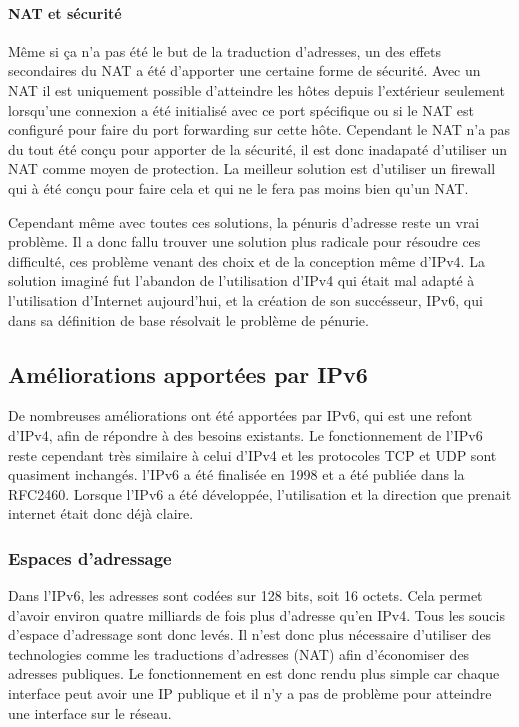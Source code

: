 \paragraph{NAT et sécurité}

Même si ça n'a pas été le but de la traduction d'adresses, un des effets
secondaires du NAT a été d'apporter une certaine forme de sécurité.  Avec un
NAT il est uniquement possible d'atteindre les hôtes depuis l'extérieur
seulement lorsqu'une connexion a été initialisé avec ce port spécifique ou si
le NAT est configuré pour faire du port forwarding sur cette hôte.  Cependant
le NAT n'a pas du tout été conçu pour apporter de la sécurité, il est donc
inadapaté d'utiliser un NAT comme moyen de protection. La meilleur solution est
d'utiliser un firewall qui à été conçu pour faire cela et qui ne le fera pas
moins bien qu'un NAT.

Cependant même avec toutes ces solutions, la pénuris d'adresse reste un vrai
problème. Il a donc fallu trouver une solution plus radicale pour résoudre ces
difficulté, ces problème venant des choix et de la conception même d'IPv4.  La
solution imaginé fut l'abandon de l'utilisation d'IPv4 qui était mal adapté à
l'utilisation d'Internet aujourd'hui, et la création de son succésseur, IPv6,
qui dans sa définition de base résolvait le problème de pénurie.

\subsection{Améliorations apportées par IPv6}

De nombreuses améliorations ont été apportées par IPv6, qui est une refont d'IPv4, afin de répondre à des besoins existants. Le fonctionnement de l'IPv6 reste cependant très similaire à celui d'IPv4 et 
les protocoles TCP et UDP sont quasiment inchangés.
l'IPv6 a été finalisée en 1998 et a été publiée dans la RFC2460. Lorsque l'IPv6 a été développée, 
l'utilisation et la direction que prenait internet était donc déjà claire. 

\subsubsection{Espaces d'adressage}
Dans l'IPv6, les adresses sont codées sur 128 bits, soit 16 octets. Cela permet d'avoir 
environ quatre milliards de fois plus d'adresse qu'en IPv4. Tous les soucis d'espace d'adressage sont donc levés. Il n'est donc plus nécessaire d'utiliser des technologies comme les traductions d'adresses
(NAT) afin d'économiser des adresses publiques. Le fonctionnement en est donc rendu plus simple car 
chaque interface peut avoir une IP publique et il n'y a pas de problème pour atteindre une interface sur le réseau.
